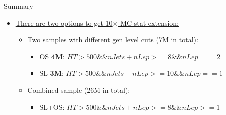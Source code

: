 \documentclass{beamer}
\begin{document}
\begin{frame}{Summary}
\begin{itemize}
\item \underline{There are two options to get 10$\times$ MC stat extension:}
\begin{itemize}
\item Two samples with different gen level cuts (7M in total):
\begin{itemize}
\item OS \textbf{4M}: $HT>500 \&\& nJets+nLep>=8 \&\& nLep==2$
\item SL \textbf{3M}: $HT>500 \&\& nJets+nLep>=10 \&\& nLep==1$
\end{itemize}
\item Combined sample (26M in total):
\begin{itemize}
\item SL+OS: $HT>500 \&\& nJets+nLep>=8 \&\& nLep>=1$
\end{itemize}
\end{itemize}
\end{itemize}
\end{frame}
%
%
\end{document}

